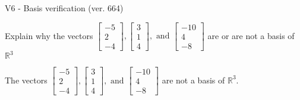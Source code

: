 \begin{exercise}
  \begin{exerciseTitle}V6 - Basis verification (ver. 664)\end{exerciseTitle}
  \begin{exerciseStatement}
    Explain why the vectors \(\left[\begin{array}{r}
-5 \\
2 \\
-4
\end{array}\right] , \left[\begin{array}{r}
3 \\
1 \\
4
\end{array}\right] , \text{ and } \left[\begin{array}{r}
-10 \\
4 \\
-8
\end{array}\right]\) are or are not a basis of \(\mathbb{R}^3\)	


  \end{exerciseStatement}
  \begin{exerciseAnswer}
   The vectors \(\left[\begin{array}{r}
-5 \\
2 \\
-4
\end{array}\right] , \left[\begin{array}{r}
3 \\
1 \\
4
\end{array}\right] , \text{ and } \left[\begin{array}{r}
-10 \\
4 \\
-8
\end{array}\right]\) 
  	 are not  a basis of \(\mathbb{R}^3\).
  


  \end{exerciseAnswer}
\end{exercise}